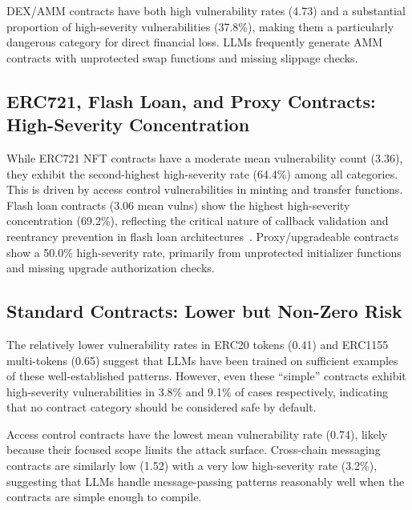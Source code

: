 DEX/AMM contracts have both high vulnerability rates (4.73) and a substantial proportion of high-severity vulnerabilities (37.8\%), making them a particularly dangerous category for direct financial loss. LLMs frequently generate AMM contracts with unprotected swap functions and missing slippage checks.

\subsection{ERC721, Flash Loan, and Proxy Contracts: High-Severity Concentration}

While ERC721 NFT contracts have a moderate mean vulnerability count (3.36), they exhibit the second-highest high-severity rate (64.4\%) among all categories. This is driven by access control vulnerabilities in minting and transfer functions. Flash loan contracts (3.06 mean vulns) show the highest high-severity concentration (69.2\%), reflecting the critical nature of callback validation and reentrancy prevention in flash loan architectures~\cite{qin2021attacking}. Proxy/upgradeable contracts show a 50.0\% high-severity rate, primarily from unprotected initializer functions and missing upgrade authorization checks.

\subsection{Standard Contracts: Lower but Non-Zero Risk}

The relatively lower vulnerability rates in ERC20 tokens (0.41) and ERC1155 multi-tokens (0.65) suggest that LLMs have been trained on sufficient examples of these well-established patterns. However, even these ``simple'' contracts exhibit high-severity vulnerabilities in 3.8\% and 9.1\% of cases respectively, indicating that no contract category should be considered safe by default.

Access control contracts have the lowest mean vulnerability rate (0.74), likely because their focused scope limits the attack surface. Cross-chain messaging contracts are similarly low (1.52) with a very low high-severity rate (3.2\%), suggesting that LLMs handle message-passing patterns reasonably well when the contracts are simple enough to compile.
